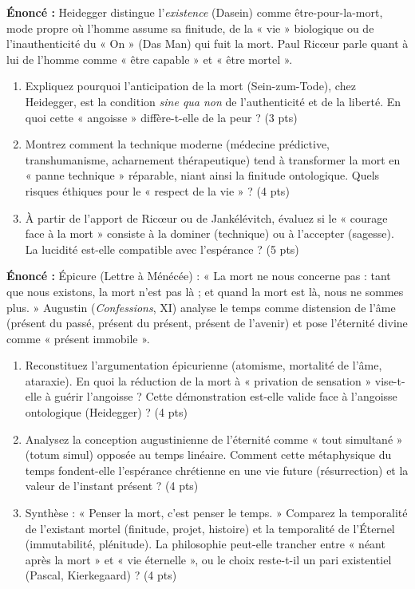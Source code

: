 \documentclass[11pt]{article}
\begin{document}
\begin{exercice}
\textbf{Énoncé :} Heidegger distingue l'\textit{existence} (Dasein) comme être-pour-la-mort, mode propre où l'homme assume sa finitude, de la « vie » biologique ou de l'inauthenticité du « On » (Das Man) qui fuit la mort. Paul Ricœur parle quant à lui de l'homme comme « être capable » et « être mortel ».
\begin{enumerate}
    \item Expliquez pourquoi l'anticipation de la mort (Sein-zum-Tode), chez Heidegger, est la condition \textit{sine qua non} de l'authenticité et de la liberté. En quoi cette « angoisse » diffère-t-elle de la peur ? (3 pts)
    \item Montrez comment la technique moderne (médecine prédictive, transhumanisme, acharnement thérapeutique) tend à transformer la mort en « panne technique » réparable, niant ainsi la finitude ontologique. Quels risques éthiques pour le « respect de la vie » ? (4 pts)
    \item À partir de l'apport de Ricœur ou de Jankélévitch, évaluez si le « courage face à la mort » consiste à la dominer (technique) ou à l'accepter (sagesse). La lucidité est-elle compatible avec l'espérance ? (5 pts)
\end{enumerate}
\end{exercice}

\begin{exercice}
\textbf{Énoncé :} Épicure (Lettre à Ménécée) : « La mort ne nous concerne pas : tant que nous existons, la mort n'est pas là ; et quand la mort est là, nous ne sommes plus. » Augustin (\textit{Confessions}, XI) analyse le temps comme distension de l'âme (présent du passé, présent du présent, présent de l'avenir) et pose l'éternité divine comme « présent immobile ».
\begin{enumerate}
    \item Reconstituez l'argumentation épicurienne (atomisme, mortalité de l'âme, ataraxie). En quoi la réduction de la mort à « privation de sensation » vise-t-elle à guérir l'angoisse ? Cette démonstration est-elle valide face à l'angoisse ontologique (Heidegger) ? (4 pts)
    \item Analysez la conception augustinienne de l'éternité comme « tout simultané » (totum simul) opposée au temps linéaire. Comment cette métaphysique du temps fondent-elle l'espérance chrétienne en une vie future (résurrection) et la valeur de l'instant présent ? (4 pts)
    \item Synthèse : « Penser la mort, c'est penser le temps. » Comparez la temporalité de l'existant mortel (finitude, projet, histoire) et la temporalité de l'Éternel (immutabilité, plénitude). La philosophie peut-elle trancher entre « néant après la mort » et « vie éternelle », ou le choix reste-t-il un pari existentiel (Pascal, Kierkegaard) ? (4 pts)
\end{enumerate}
\end{exercice}
\end{document}
